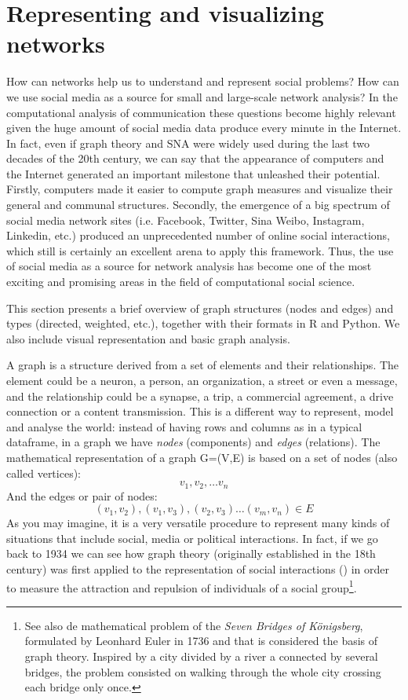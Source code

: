 \section{Representing and visualizing networks}
\label{sec:graph}

How can networks help us to understand and represent social problems? How can we use social media as a source for small and large-scale network analysis? In the computational analysis of communication these questions become highly relevant given the huge amount of social media data produce every minute in the Internet. In fact, even if graph theory and SNA were widely used during the last two decades of the 20th century, we can say that the appearance of computers and the Internet generated an important milestone that unleashed their potential. Firstly, computers made it easier to compute graph measures and visualize their general and communal structures. Secondly, the emergence of a big spectrum of social media network sites (i.e. Facebook, Twitter, Sina Weibo, Instagram, Linkedin, etc.) produced an unprecedented number of online social interactions, which still is certainly an excellent arena to apply this framework. Thus, the use of social media as a source for network analysis has become one of the most exciting and promising areas in the field of computational social science.

This section presents a brief overview of graph structures (nodes and edges) and types (directed, weighted, etc.), together with their formats in R and Python. We also include visual representation and basic graph analysis.  
 
A graph is a structure derived from a set of elements and their relationships. The element could be a neuron, a person, an organization, a street or even a message, and the relationship could be a synapse, a trip, a commercial agreement, a drive connection or a content transmission. This is a different way to represent, model and analyse the world: instead of having rows and columns as in a typical dataframe, in a graph we have \textit{nodes} (components) and \textit{edges} (relations). The mathematical representation of a graph G=(V,E) is based on a set of nodes (also called vertices): \[{v_{1}, v_{2},… v_{n}}\] And the edges or pair of nodes: \[{(v_{1}, v_{2}), (v_{1}, v_{3}), (v_{2},v_{3}) … (v_{m}, v_{n}) \in E}\] As you may imagine, it is a very versatile procedure to represent many kinds of situations that include social, media or political interactions. In fact, if we go back to 1934 we can see how graph theory (originally established in the 18th century) was first applied to the representation of social interactions (\cite{moreno1934shall}) in order to measure the attraction and repulsion of individuals of a social group\footnote{See also de mathematical problem of the \textit{Seven Bridges of Königsberg}, formulated by Leonhard Euler in 1736 and that is considered the basis of graph theory. Inspired by a city divided by a river a connected by several bridges, the problem consisted on walking through the whole city crossing each bridge only once.}.

